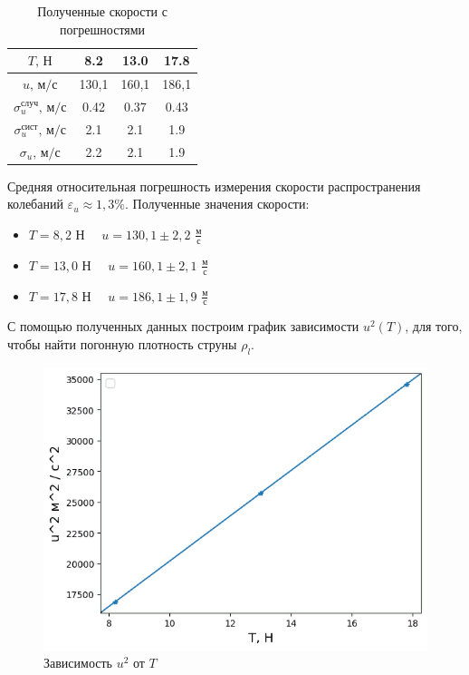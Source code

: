 \documentclass[
a4paper, %
12pt, %
]{article}
\begin{document}
	\begin{table}[h]
		\begin{center}
			\begin{tabular}{|c|c|c|c|}
				\hline
				$T\text{, Н}$ & 8.2 & 13.0 & 17.8\\ \hline
				$u\text{, м/с}$  & 130,1 & 160,1 & 186,1 \\ \hline
				$\sigma_{u}^{\text{случ}} \text{, м/с}$ & 0.42 & 0.37 & 0.43  \\ \hline
				$\sigma_{u}^{\text{сист}} \text{, м/с}$ & 2.1 & 2.1 & 1.9 \\ \hline
				$\sigma_{u} \text{, м/с}$ & 2.2 & 2.1 & 1.9 \\ \hline
			\end{tabular}
			\caption{Полученные скорости с погрешностями}
		\end{center}
	\end{table}
	
	\noindent
	Средняя относительная погрешность измерения скорости распространения колебаний $\varepsilon_u \approx 1,3\% $. Полученные значения скорости:
	
	\begin{itemize}
		\item $T = 8,2$ Н  $\quad u = 130,1 \pm 2,2$ $\frac{\text{м}}{\text{с}}$
		\item  $T = 13,0$ Н  $\quad u = 160,1 \pm 2,1$ $\frac{\text{м}}{\text{с}}$
		\item  $T = 17,8$ Н  $\quad u = 186,1 \pm 1,9$ $\frac{\text{м}}{\text{с}}$
	\end{itemize}
	
	С помощью полученных данных построим график зависимости $u^2(T)$, для того, чтобы найти погонную плотность струны $ \rho_l $.
	
	\begin{figure}[h!]
		\begin{center}
			\includegraphics[scale=0.96]{graph_u_T.png}
			\caption{Зависимость $ u^2 $ от $ T $}
			\label{graph_u_T}
		\end{center}
	\end{figure}
	
\end{document}
